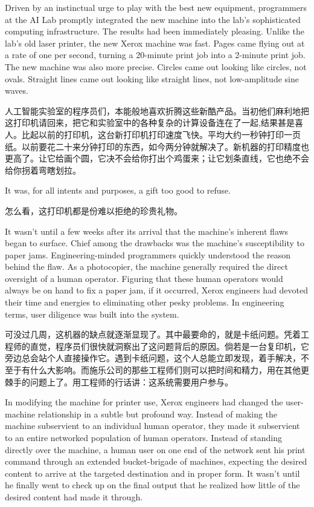 \ifdefined\eng
Driven by an instinctual urge to play with the best new equipment, programmers at the AI Lab promptly integrated the new machine into the lab's sophisticated computing infrastructure. The results had been immediately pleasing. Unlike the lab's old laser printer, the new Xerox machine was fast. Pages came flying out at a rate of one per second, turning a 20-minute print job into a 2-minute print job. The new machine was also more precise. Circles came out looking like circles, not ovals. Straight lines came out looking like straight lines, not low-amplitude sine waves.
\fi

\ifdefined\chs
人工智能实验室的程序员们，本能般地喜欢折腾这些新酷产品。当初他们麻利地把这打印机请回来，把它和实验室中的各种复杂的计算设备连在了一起,结果甚是喜人。比起以前的打印机，这台新打印机打印速度飞快。平均大约一秒钟打印一页纸。以前要花二十来分钟打印的东西，如今两分钟就解决了。新机器的打印精度也更高了。让它给画个圆，它决不会给你打出个鸡蛋来；让它划条直线，它也绝不会给你拐着弯瞎划拉。
\fi

\ifdefined\eng
It was, for all intents and purposes, a gift too good to refuse.
\fi

\ifdefined\chs
怎么看，这打印机都是份难以拒绝的珍贵礼物。
\fi

\ifdefined\eng
It wasn't until a few weeks after its arrival that the machine's inherent flaws began to surface. Chief among the drawbacks was the machine's susceptibility to paper jams. Engineering-minded programmers quickly understood the reason behind the flaw. As a photocopier, the machine generally required the direct oversight of a human operator. Figuring that these human operators would always be on hand to fix a paper jam, if it occurred, Xerox engineers had devoted their time and energies to eliminating other pesky problems. In engineering terms, user diligence was built into the system.
\fi

\ifdefined\chs
可没过几周，这机器的缺点就逐渐显现了。其中最要命的，就是卡纸问题。凭着工程师的直觉，程序员们很快就洞察出了这问题背后的原因。倘若是一台复印机，它旁边总会站个人直接操作它。遇到卡纸问题，这个人总能立即发现，着手解决，不至于有什么大影响。而施乐公司的那些工程师们则可以把时间和精力，用在其他更棘手的问题上了。用工程师的行话讲：这系统需要用户参与。
\fi

\ifdefined\eng
In modifying the machine for printer use, Xerox engineers had changed the user-machine relationship in a subtle but profound way. Instead of making the machine subservient to an individual human operator, they made it subservient to an entire networked population of human operators. Instead of standing directly over the machine, a human user on one end of the network sent his print command through an extended bucket-brigade of machines, expecting the desired content to arrive at the targeted destination and in proper form. It wasn't until he finally went to check up on the final output that he realized how little of the desired content had made it through.
\fi

